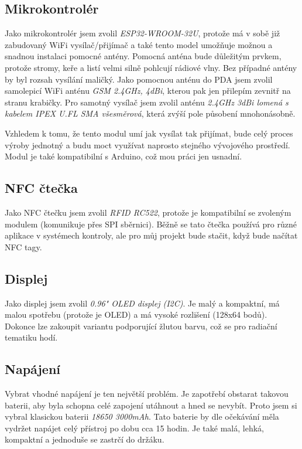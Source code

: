 \documentclass[11pt,a4paper]{article}
\begin{document}
\subsection{Mikrokontrolér}
Jako mikrokontrolér jsem zvolil \textit{ESP32-WROOM-32U}, protože má v sobě již zabudovaný WiFi vysílač/přijímač a také tento model umožňuje možnou a snadnou instalaci pomocné antény. Pomocná anténa bude důležitým prvkem, protože stromy, keře a listí velmi silně pohlcují rádiové vlny. Bez případné antény by byl rozsah vysílání maličký. Jako pomocnou anténu do PDA jsem zvolil samolepicí WiFi anténu \textit{GSM 2.4GHz, 4dBi}, kterou pak jen přilepím zevnitř na stranu krabičky. Pro samotný vysílač jsem zvolil anténu \textit{2.4GHz 3dBi lomená s kabelem IPEX U.FL SMA všesměrová}, která zvýší pole působení mnohonásobně. 

\noindent Vzhledem k tomu, že tento modul umí jak vysílat tak přijímat, bude celý proces výroby jednotný a budu moct využívat naprosto stejného vývojového prostředí. Modul je také kompatibilní s Arduino, což mou práci jen usnadní.

\subsection{NFC čtečka}
Jako NFC čtečku jsem zvolil \textit{RFID RC522}, protože je kompatibilní se zvoleným modulem (komunikuje přes SPI sběrnici). Běžně se tato čtečka používá pro různé aplikace v systémech kontroly, ale pro můj projekt bude stačit, když bude načítat NFC tagy.  

\subsection{Displej}
Jako displej jsem zvolil \textit{0.96" OLED displej (I2C)}. Je malý a kompaktní, má malou spotřebu (protože je OLED) a má vysoké rozlišení (128x64 bodů). Dokonce lze zakoupit variantu podporující žlutou barvu, což se pro radiační tematiku hodí. 

\subsection{Napájení}
Vybrat vhodné napájení je ten největší problém. Je zapotřebí obstarat takovou baterii, aby byla schopna celé zapojení utáhnout a hned se nevybít. Proto jsem si vybral klasickou baterii \textit{18650 3000mAh}. Tato baterie by dle očekávání měla vydržet napájet celý přístroj po dobu cca 15 hodin. Je také malá, lehká, kompaktní a jednoduše se zastrčí do držáku.
\end{document}
